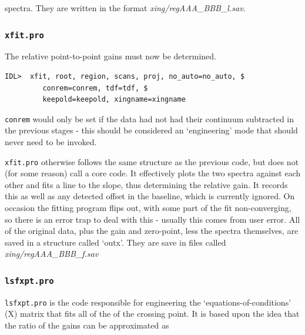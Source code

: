 \documentclass[11pt]{article}
\begin{document}
spectra. They are written in the format {\it xing/regAAA\_BBB\_l.sav}. 

\subsubsection{\texttt{xfit.pro}}
The relative point-to-point gains must now be determined. 
\begin{verbatim}
IDL>  xfit, root, region, scans, proj, no_auto=no_auto, $
         conrem=conrem, tdf=tdf, $
         keepold=keepold, xingname=xingname
\end{verbatim}
\texttt{conrem} would only be set if the data had not had their continuum subtracted in the previous stages - this should be considered an `engineering' mode that should never need to be invoked. 

\texttt{xfit.pro} otherwise follows the same structure as the previous code, but does not (for some reason) call a core code. It effectively plots the two spectra against each other and fits a line to the slope, thus determining the relative gain. It records this as well as any detected offset in the baseline, which is currently ignored. On occasion the fitting program flips out, with some part of the fit non-converging, so there is an error trap to deal with this - usually this comes from user error. All of the original data, plus the gain and zero-point, less the spectra themselves, are saved in a structure called `outx'. They are save in files called {\it xing/regAAA\_BBB\_f.sav}

\subsubsection{\texttt{lsfxpt.pro}}
\texttt{lsfxpt.pro} is the code responsible for engineering the `equations-of-conditions' (X) matrix that fits all of the of the crossing point. It is based upon the idea that the ratio of the gains can be approximated as
\end{document}
